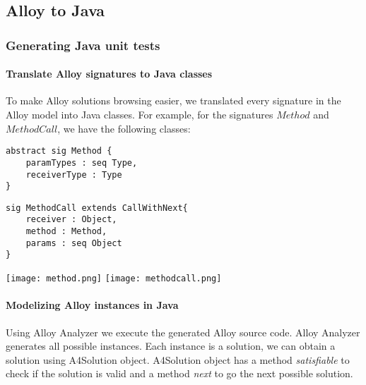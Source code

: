 \subsection{Alloy to Java}
\subsubsection{Generating Java unit tests}
\paragraph{Translate Alloy signatures to Java classes}
To make Alloy solutions browsing easier, we translated every signature in the Alloy model into Java classes. For example, for the signatures $Method$ and $MethodCall$, we have the following classes:



\newsavebox{\firstlisting}
\begin{lrbox}{\firstlisting}%
\begin{lstlisting}
abstract sig Method {
    paramTypes : seq Type,
    receiverType : Type
}

\end{lstlisting}
\end{lrbox}
\newsavebox{\secondlisting}
\begin{lrbox}{\secondlisting}%
\begin{lstlisting}
sig MethodCall extends CallWithNext{
    receiver : Object,
    method : Method,
    params : seq Object
}
\end{lstlisting}
\end{lrbox}

\begin{figure}[h]
{\usebox{\firstlisting}} \hfill%
{\usebox{\secondlisting}}
\end{figure}

\texttt{[image: method.png]}
\hfill
\texttt{[image: methodcall.png]}



\paragraph{Modelizing Alloy instances in Java}
Using Alloy Analyzer we execute the generated Alloy source code. Alloy Analyzer generates all possible instances.
Each instance is a solution, we can obtain a solution using A4Solution object. A4Solution object has a method \textit{satisfiable} to check if the solution is valid and a method \textit{next} to go the next possible solution.

